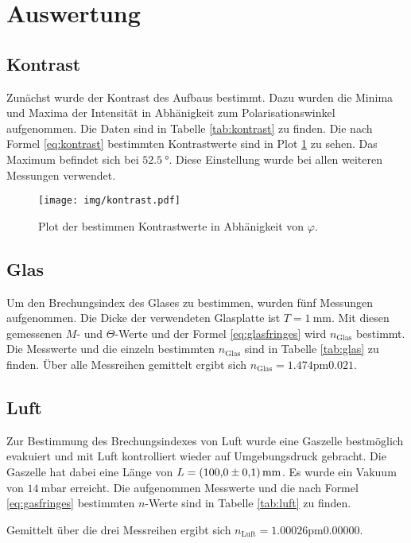 \section{Auswertung}
\label{sec:Auswertung}
\subsection{Kontrast}
Zunächst wurde der Kontrast des Aufbaus bestimmt. Dazu wurden die Minima und Maxima der Intensität in Abhänigkeit zum Polarisationswinkel aufgenommen. Die Daten sind in Tabelle \ref{tab:kontrast} zu finden. Die nach Formel \eqref{eq:kontrast} bestimmten Kontrastwerte sind in Plot \ref{img:kontrast} zu sehen. Das  Maximum befindet sich bei $\SI{52.5}{°}$. Diese Einstellung wurde bei allen weiteren Messungen verwendet.
\begin{figure}
  \centering
  \texttt{[image: img/kontrast.pdf]}
  \caption{Plot der bestimmen Kontrastwerte in Abhänigkeit von $\varphi$.}
  \label{img:kontrast}
\end{figure}


\subsection{Glas}
Um den Brechungsindex des Glases zu bestimmen, wurden fünf Messungen aufgenommen. Die Dicke der verwendeten Glasplatte ist $T=\SI{1}{\milli\meter}$.
Mit diesen gemessenen $M$- und $\Theta$-Werte und der Formel \eqref{eq:glasfringes} wird $n_\text{Glas}$ bestimmt. Die Messwerte und die einzeln bestimmten
 $n_\text{Glas}$ sind in Tabelle \ref{tab:glas} zu finden.
Über alle Messreihen gemittelt ergibt sich $n_\text{Glas}=\si{1.474\pm 0.021}$.

\subsection{Luft}
Zur Bestimmung des Brechungsindexes von Luft wurde eine Gaszelle bestmöglich evakuiert und mit Luft kontrolliert wieder auf Umgebungsdruck gebracht. Die Gaszelle hat dabei eine Länge von $L=\SI{100\pm 0.1}{\milli \meter}$. Es wurde ein
Vakuum von $\SI{14}{\milli \bar}$ erreicht. Die aufgenommen Messwerte und die nach Formel \eqref{eq:gasfringes} bestimmten $n$-Werte sind in Tabelle \ref{tab:luft} zu finden.

Gemittelt über die drei Messreihen ergibt sich $n_\text{Luft}=\si{1.00026 \pm 0.00000}$.
